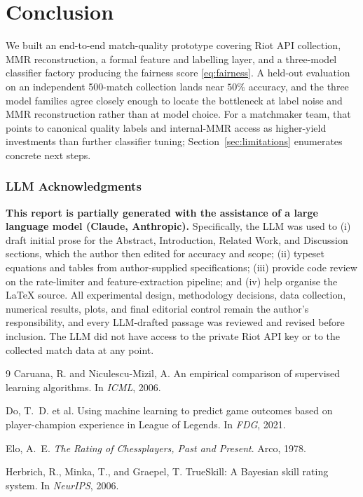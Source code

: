 \documentclass{article}
\begin{document}
\section{Conclusion}

We built an end-to-end match-quality prototype covering Riot API
collection, MMR reconstruction, a formal feature and labelling layer, and
a three-model classifier factory producing the fairness score
\eqref{eq:fairness}. A held-out evaluation on an independent 500-match
collection lands near $50\%$ accuracy, and the three model families
agree closely enough to locate the bottleneck at label noise and MMR
reconstruction rather than at model choice. For a matchmaker team, that
points to canonical quality labels and internal-MMR access as higher-yield
investments than further classifier tuning;
Section~\ref{sec:limitations} enumerates concrete next steps.

\subsubsection*{LLM Acknowledgments}
\textbf{This report is partially generated with the assistance of a large
language model (Claude, Anthropic).} Specifically, the LLM was used to
(i) draft initial prose for the Abstract, Introduction, Related Work, and
Discussion sections, which the author then edited for accuracy and scope;
(ii) typeset equations and tables from author-supplied specifications;
(iii) provide code review on the rate-limiter and feature-extraction
pipeline; and (iv) help organise the LaTeX source. All experimental
design, methodology decisions, data collection, numerical results, plots,
and final editorial control remain the author's responsibility, and every
LLM-drafted passage was reviewed and revised before inclusion. The LLM
did not have access to the private Riot API key or to the collected match
data at any point.


\begin{thebibliography}{9}
Caruana, R. and Niculescu-Mizil, A.
\newblock An empirical comparison of supervised learning algorithms.
\newblock In \emph{ICML}, 2006.

Do, T.~D. et al.
\newblock Using machine learning to predict game outcomes based on player-champion experience in League of Legends.
\newblock In \emph{FDG}, 2021.

Elo, A.~E.
\newblock \emph{The Rating of Chessplayers, Past and Present}.
\newblock Arco, 1978.

Herbrich, R., Minka, T., and Graepel, T.
\newblock TrueSkill: A Bayesian skill rating system.
\newblock In \emph{NeurIPS}, 2006.

\end{thebibliography}
\end{document}
